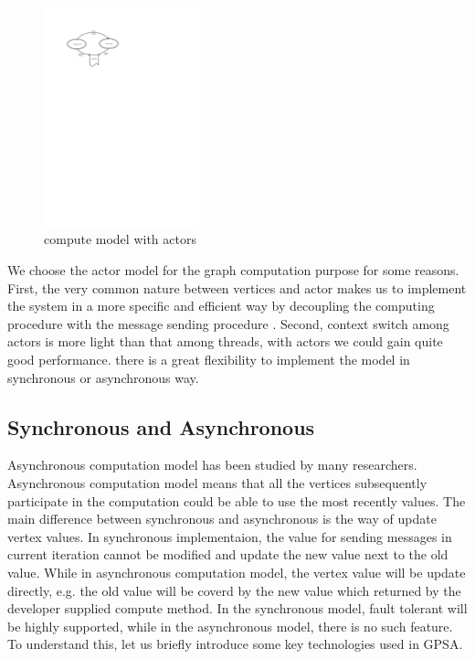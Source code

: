 \documentclass[twocolumn,a4paper,10pt]{article}
\begin{document}
\begin{figure}[htbp]
\centering
 \begin{minipage}[]{1.4\textwidth}
     \includegraphics[width=0.4\textwidth,angle=0]{figure/computemodel.pdf}
\end{minipage}
    \caption{compute model with actors}
\end{figure}

We choose the actor model for the graph computation purpose for some reasons. First, the very common nature between vertices and actor makes us to implement the system in a more specific and efficient way by decoupling the computing procedure with the message sending procedure . Second, context switch among actors is more light than that among threads, with actors we could gain quite good performance. there is a great flexibility to implement the model in synchronous or asynchronous way.\newline


\subsection{Synchronous and Asynchronous }
Asynchronous computation model has been studied by many researchers. Asynchronous computation model means that all the vertices subsequently participate in the computation could be able to use the most recently values. The main difference between synchronous and asynchronous is the way of update vertex values. In synchronous implementaion, the value for sending messages in current iteration cannot be modified and update the new value next to the old value. While in asynchronous computation model, the vertex value will be update directly, e.g. the old value will be coverd by the new value which returned by the developer supplied compute method.\newline
In the synchronous model,  fault tolerant will be highly supported, while in the asynchronous model, there is no such feature. To understand this, let us briefly introduce some key technologies used in GPSA. 
\end{document}
